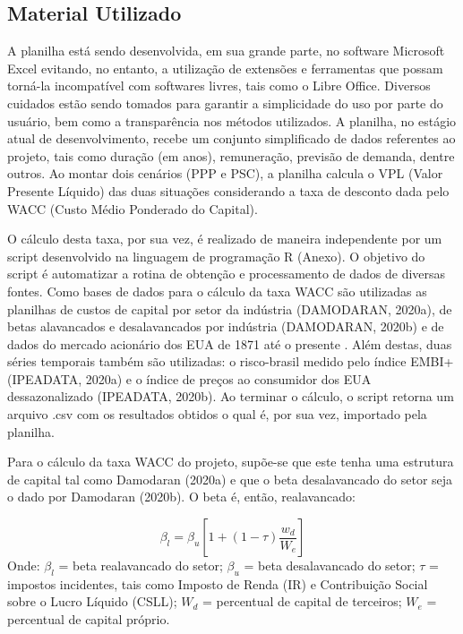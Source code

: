 \subsection{Material Utilizado}

A planilha está sendo desenvolvida, em sua grande parte, no software Microsoft Excel evitando, no entanto, a utilização de extensões e ferramentas que possam torná-la incompatível com softwares livres, tais como o Libre Office. Diversos cuidados estão sendo tomados para garantir a simplicidade do uso por parte do usuário, bem como a transparência nos métodos utilizados. A planilha, no estágio atual de desenvolvimento, recebe um conjunto simplificado de dados referentes ao projeto, tais como duração (em anos), remuneração, previsão de demanda, dentre outros. Ao montar dois cenários (PPP e PSC), a planilha calcula o VPL (Valor Presente Líquido) das duas situações considerando a taxa de desconto dada pelo WACC (Custo Médio Ponderado do Capital). 

O cálculo desta taxa, por sua vez, é realizado de maneira independente por um script desenvolvido na linguagem de programação R (Anexo). O objetivo do script é automatizar a rotina de obtenção e processamento de dados de diversas fontes. Como bases de dados para o cálculo da taxa WACC são utilizadas as planilhas de custos de capital por setor da indústria (DAMODARAN, 2020a), de betas alavancados e desalavancados por indústria (DAMODARAN, 2020b) e de dados do mercado acionário dos EUA de 1871 até o presente \cite{o2020using}. Além destas, duas séries temporais também são utilizadas: o risco-brasil medido pelo índice EMBI+ (IPEADATA, 2020a) e o índice de preços ao consumidor dos EUA dessazonalizado (IPEADATA, 2020b). Ao terminar o cálculo, o script retorna um arquivo .csv com os resultados obtidos o qual é, por sua vez, importado pela planilha.

Para o cálculo da taxa WACC do projeto, supõe-se que este tenha uma estrutura de capital tal como Damodaran (2020a) e que o beta desalavancado do setor seja o dado por Damodaran (2020b). O beta é, então, realavancado:

$$\beta_l=\beta_u\left[1+(1-\tau)\frac{w_d}{W_e}\right]$$
Onde: $\beta_l$ = beta realavancado do setor; $\beta_u$ = beta desalavancado do setor; $\tau$ = impostos incidentes, tais como Imposto de Renda (IR) e Contribuição Social sobre o Lucro Líquido (CSLL); $W_d$ = percentual de capital de terceiros; $W_e$ = percentual de capital próprio.

